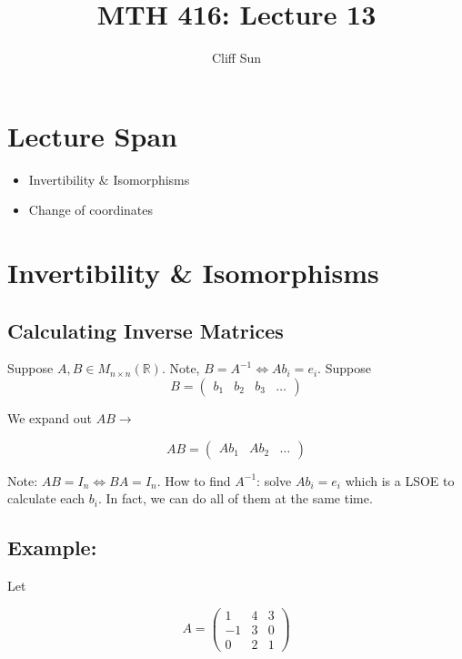 \documentclass{article}
\title{MTH 416: Lecture 13}
\author{Cliff Sun}
\newtheorem{one minute paper}[theorem]{One Minute Paper}
\begin{document}
\maketitle

\section*{Lecture Span}
\begin{itemize}
    \item Invertibility \& Isomorphisms
    \item Change of coordinates
\end{itemize}

\section*{Invertibility \& Isomorphisms}

\subsection*{Calculating Inverse Matrices}

Suppose $A,B \in M_{n\times n}(\mathbb{R})$. Note, $B = A^{-1} \iff Ab_i = e_i$. Suppose 
\begin{equation}
    B = \begin{pmatrix}
        b_1 & b_2 & b_3 & \dots
    \end{pmatrix}
\end{equation}

We expand out $AB \rightarrow$

\begin{equation}
    AB = \begin{pmatrix}
        Ab_1 & Ab_2 & \dots
    \end{pmatrix}
\end{equation}

Note: $AB = I_n \iff BA = I_n$. How to find $A^{-1}$: solve $Ab_i = e_i$ which is a LSOE to calculate each $b_i$. In fact,
we can do all of them at the same time.

\subsection*{Example:}

Let 

\begin{equation}
    A = \begin{pmatrix}
        1 & 4 & 3 \\
        -1 & 3 & 0 \\
        0 & 2 & 1
    \end{pmatrix}
\end{equation}
\end{document}
